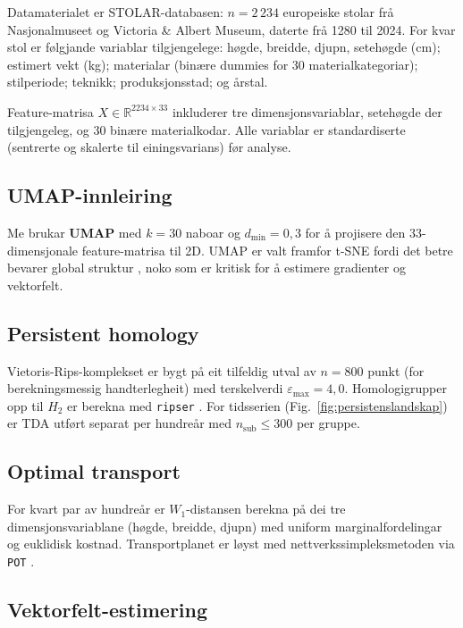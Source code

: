 \documentclass[10pt, a4paper, twocolumn]{article}
\begin{document}
Datamaterialet er STOLAR-databasen: $n = 2\,234$ europeiske stolar fr\aa{} Nasjonalmuseet og Victoria \& Albert Museum, daterte fr\aa{} 1280 til 2024. For kvar stol er f\o lgjande variablar tilgjengelege: h\o gde, breidde, djupn, seteh\o gde (cm); estimert vekt (kg); materialar (bin\ae re dummies for 30 materialkategoriar); stilperiode; teknikk; produksjonsstad; og \aa rstal.

Feature-matrisa $X \in \mathbb{R}^{2234 \times 33}$ inkluderer tre dimensjonsvariablar, seteh\o gde der tilgjengeleg, og 30 bin\ae re materialkodar. Alle variablar er standardiserte (sentrerte og skalerte til einingsvarians) f\o r analyse.

\subsection{UMAP-innleiring}

Me brukar \textbf{UMAP} \citep{McInnes2018} med $k = 30$ naboar og $d_\text{min} = 0{,}3$ for \aa{} projisere den 33-dimensjonale feature-matrisa til 2D. UMAP er valt framfor t-SNE fordi det betre bevarer global struktur \citep{Becht2019}, noko som er kritisk for \aa{} estimere gradienter og vektorfelt.

\subsection{Persistent homology}

Vietoris-Rips-komplekset er bygt p\aa{} eit tilfeldig utval av $n = 800$ punkt (for berekningsmessig handterlegheit) med terskelverdi $\varepsilon_\text{max} = 4{,}0$. Homologigrupper opp til $H_2$ er berekna med \texttt{ripser} \citep{Bauer2021}. For tidsserien (Fig.~\ref{fig:persistenslandskap}) er TDA utf\o rt separat per hundre\aa r med $n_\text{sub} \leq 300$ per gruppe.

\subsection{Optimal transport}

For kvart par av hundre\aa r er $W_1$-distansen berekna p\aa{} dei tre dimensjonsvariablane (h\o gde, breidde, djupn) med uniform marginalfordelingar og euklidisk kostnad. Transportplanet er l\o yst med nettverkssimpleksmetoden via \texttt{POT} \citep{Flamary2021}.

\subsection{Vektorfelt-estimering}
\end{document}
